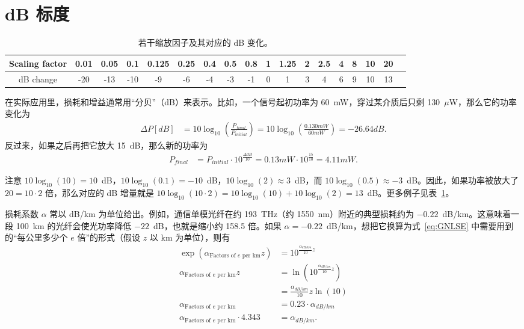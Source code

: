 \section{dB 标度}
\begin{table}[]
    \centering
    \begin{tabular}{ c|c|c|c|c|c|c|c|c|c|c|c|c|c|c|c|c|c }
 Scaling factor &0.01&0.05 & 0.1 &0.125 &0.25&0.4 &0.5 & 0.8&1&1.25 &2 &2.5 &4 &8 &10 &20 & \\  \hline
 dB change & -20 &-13 &-10 & -9&  -6&-4& -3&-1&0&1 &3 &4 &6 &9 & 10&13
\end{tabular}
    \caption{若干缩放因子及其对应的 dB 变化。}
    \label{tab:dB}
\end{table}
在实际应用里，损耗和增益通常用“分贝”（dB）来表示。比如，一个信号起初功率为 60~mW，穿过某介质后只剩 130~$\mu$W，那么它的功率变化为
\begin{align}
    \Delta P [dB] &= 10 \log_{10}\left(\frac{P_{final}}{P_{initial}} \right)= 10 \log_{10}\left(\frac{0.130 mW}{60 mW} \right) = -26.64 dB.
\end{align}
反过来，如果之后再把它放大 15~dB，那么新的功率为
\begin{align}
\label{eq:boost}
    P_{final}&=P_{initial}\cdot10^{\frac{\Delta dB}{10}}=0.13mW\cdot10^{\frac{15}{10}} = 4.11 mW.
\end{align}


注意 $10\log_{10}(10)=10$~dB，$10\log_{10}(0.1)=-10$~dB，$10\log_{10}(2)\approx3$~dB，而 $10\log_{10}(0.5)\approx-3$~dB。因此，如果功率被放大了 $20=10\cdot 2$ 倍，那么对应的 dB 增量就是 $10\log_{10}(10\cdot 2)=10\log_{10}(10)+10\log_{10}(2)=13$~dB。更多例子见表~\ref{tab:dB}。

损耗系数 $\alpha$ 常以 dB/km 为单位给出。例如，通信单模光纤在约 193~THz（约 1550~nm）附近的典型损耗约为 $-0.22$~dB/km。这意味着一段 100~km 的光纤会使光功率降低 $-22$~dB，也就是缩小约 158.5 倍。如果 $\alpha=-0.22$~dB/km，想把它换算为式~\ref{eq:GNLSE} 中需要用到的“每公里多少个 $e$ 倍”的形式（假设 $z$ 以 km 为单位），则有
\begin{align}
    \exp\left(\alpha_{\text{Factors of $e$ per km}}z\right) &= 10^{ \frac{\alpha_{dB/km}}{10}z} \\ \nonumber
    \alpha_{\text{Factors of $e$ per km}}z &= \ln\left(10^{ \frac{\alpha_{dB/km}}{10}z} \right)\\ \nonumber
    &= \frac{\alpha_{dB/km}}{10}z \ln(10)\\ \nonumber
    \alpha_{\text{Factors of $e$ per km}} &= 0.23\cdot \alpha_{dB/km}\\ \nonumber
    \alpha_{\text{Factors of $e$ per km}}\cdot4.343&=\alpha_{dB/km}.
\end{align}


